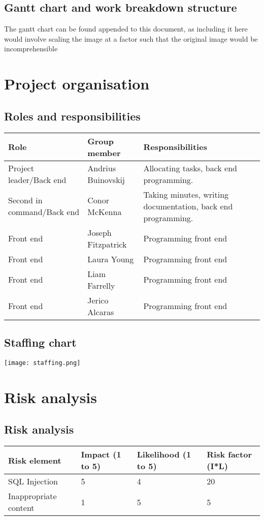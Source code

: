 \documentclass[a4paper, 12pt]{article}
\begin{document}
		\subsection{Gantt chart and work breakdown structure}
			\par The gantt chart can be found appended to this document, as including it here would involve
			scaling the image at a factor such that the original image would be incomprehensible
	\newpage
	\section{Project organisation}
		\subsection{Roles and responsibilities}
			\begin{tabular}{p{35 mm} p{35 mm} p{54 mm}}
				\toprule
					Role & Group member & Responsibilities \\
					\midrule
					Project leader/Back end & Andrius Buinovskij & Allocating tasks, back end programming. \\
					\midrule
					Second in command/Back end & Conor McKenna & Taking minutes, writing documentation, back end programming. \\
					\midrule
					Front end & Joseph Fitzpatrick & Programming front end \\
					\midrule
					Front end & Laura Young & Programming front end \\
					\midrule
					Front end & Liam Farrelly & Programming front end \\
					\midrule
					Front end & Jerico Alcaras & Programming front end \\
				\bottomrule
			\end{tabular}

		\subsection{Staffing chart}
			\texttt{[image: staffing.png]}

	\newpage
	\section{Risk analysis}
		\subsection{Risk analysis}
			\begin{tabular}{p{30 mm} p{30 mm} p{30 mm} p{30 mm}}
				\toprule
					Risk element & Impact (1 to 5) & Likelihood (1 to 5) & Risk factor (I*L) \\
					\midrule
					SQL Injection & 5 & 4 & 20 \\
					\midrule
					Inappropriate content & 1 & 5 & 5 \\
				\bottomrule
			\end{tabular}
\end{document}
